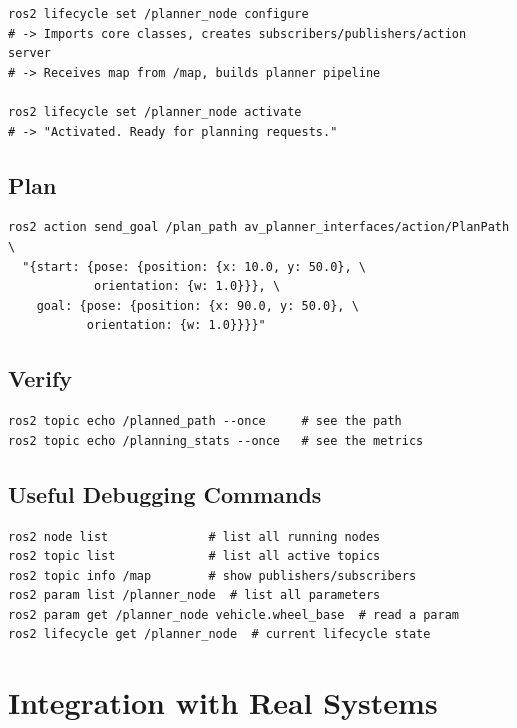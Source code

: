 \documentclass[12pt, a4paper]{article}
\begin{document}
\begin{lstlisting}[style=bash]
ros2 lifecycle set /planner_node configure
# -> Imports core classes, creates subscribers/publishers/action server
# -> Receives map from /map, builds planner pipeline

ros2 lifecycle set /planner_node activate
# -> "Activated. Ready for planning requests."
\end{lstlisting}

\subsection{Plan}

\begin{lstlisting}[style=bash]
ros2 action send_goal /plan_path av_planner_interfaces/action/PlanPath \
  "{start: {pose: {position: {x: 10.0, y: 50.0}, \
            orientation: {w: 1.0}}}, \
    goal: {pose: {position: {x: 90.0, y: 50.0}, \
           orientation: {w: 1.0}}}}"
\end{lstlisting}

\subsection{Verify}

\begin{lstlisting}[style=bash]
ros2 topic echo /planned_path --once     # see the path
ros2 topic echo /planning_stats --once   # see the metrics
\end{lstlisting}

\subsection{Useful Debugging Commands}

\begin{lstlisting}[style=bash]
ros2 node list              # list all running nodes
ros2 topic list             # list all active topics
ros2 topic info /map        # show publishers/subscribers
ros2 param list /planner_node  # list all parameters
ros2 param get /planner_node vehicle.wheel_base  # read a param
ros2 lifecycle get /planner_node  # current lifecycle state
\end{lstlisting}


\section{Integration with Real Systems}
\label{sec:integration}
\end{document}
